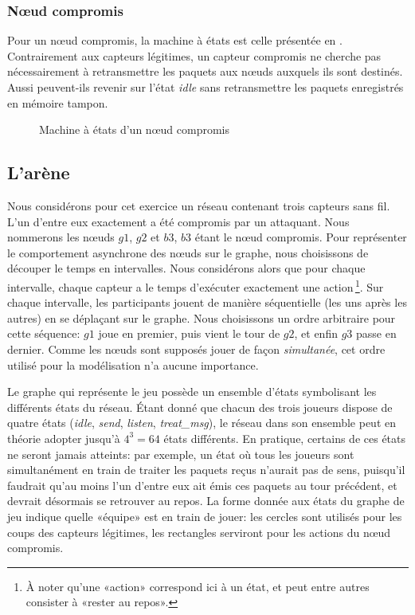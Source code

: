         \subsubsection{Nœud compromis}
Pour un nœud compromis, la machine à états est celle présentée en .
Contrairement aux capteurs légitimes, un capteur compromis ne cherche pas nécessairement à retransmettre les paquets aux nœuds auxquels ils sont destinés.
Aussi peuvent-ils revenir sur l'état \emph{idle} sans retransmettre les paquets enregistrés en mémoire tampon.
\begin{figure}[H]
    \centering
    
    \caption{Machine à états d'un nœud compromis}\label{tj:fig:autBadNode}
\end{figure}

\subsection{L'arène}
Nous considérons pour cet exercice un réseau contenant trois capteurs sans fil.
L'un d'entre eux exactement a été compromis par un attaquant.
Nous nommerons les nœuds $g1$, $g2$ et $b3$, $b3$ étant le nœud compromis.
Pour représenter le comportement asynchrone des nœuds sur le graphe, nous choisissons de découper le temps en intervalles.
Nous considérons alors que pour chaque intervalle, chaque capteur a le temps d'exécuter exactement une action\,\footnote{À noter qu'une «action» correspond ici à un état, et peut entre autres consister à «rester au repos».}.
Sur chaque intervalle, les participants jouent de manière séquentielle (les uns après les autres) en se déplaçant sur le graphe.
Nous choisissons un ordre arbitraire pour cette séquence: $g1$ joue en premier, puis vient le tour de $g2$, et enfin $g3$ passe en dernier.
Comme les nœuds sont supposés jouer de façon \emph{simultanée}, cet ordre utilisé pour la modélisation n'a aucune importance.

Le graphe qui représente le jeu possède un ensemble d'états symbolisant les différents états du réseau.
Étant donné que chacun des trois joueurs dispose de quatre états (\emph{idle}, \emph{send}, \emph{listen}, \emph{treat\_msg}), le réseau dans son ensemble peut en théorie adopter jusqu'à $4^3=64$ états différents.
En pratique, certains de ces états ne seront jamais atteints: par exemple, un état où tous les joueurs sont simultanément en train de traiter les paquets reçus n'aurait pas de sens, puisqu'il faudrait qu'au moins l'un d'entre eux ait émis ces paquets au tour précédent, et devrait désormais se retrouver au repos.
La forme donnée aux états du graphe de jeu indique quelle «équipe» est en train de jouer: les cercles sont utilisés pour les coups des capteurs légitimes, les rectangles serviront pour les actions du nœud compromis.

